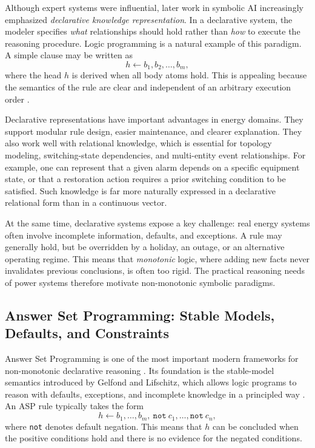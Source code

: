 Although expert systems were influential, later work in symbolic AI increasingly emphasized \emph{declarative knowledge representation}. In a declarative system, the modeler specifies \emph{what} relationships should hold rather than \emph{how} to execute the reasoning procedure. Logic programming is a natural example of this paradigm. A simple clause may be written as
\begin{equation}
	h \leftarrow b_1,b_2,\dots,b_m,
	\label{eq:ch32_logic_programming}
\end{equation}
where the head $h$ is derived when all body atoms hold. This is appealing because the semantics of the rule are clear and independent of an arbitrary execution order \cite{baral2003knowledge}.

Declarative representations have important advantages in energy domains. They support modular rule design, easier maintenance, and clearer explanation. They also work well with relational knowledge, which is essential for topology modeling, switching-state dependencies, and multi-entity event relationships. For example, one can represent that a given alarm depends on a specific equipment state, or that a restoration action requires a prior switching condition to be satisfied. Such knowledge is far more naturally expressed in a declarative relational form than in a continuous vector.

At the same time, declarative systems expose a key challenge: real energy systems often involve incomplete information, defaults, and exceptions. A rule may generally hold, but be overridden by a holiday, an outage, or an alternative operating regime. This means that \emph{monotonic} logic, where adding new facts never invalidates previous conclusions, is often too rigid. The practical reasoning needs of power systems therefore motivate non-monotonic symbolic paradigms.

\subsection{Answer Set Programming: Stable Models, Defaults, and Constraints}

Answer Set Programming is one of the most important modern frameworks for non-monotonic declarative reasoning \cite{gelfond1988stable,brewka2011asp,gebser2012answer,gebser2019multi}. Its foundation is the stable-model semantics introduced by Gelfond and Lifschitz, which allows logic programs to reason with defaults, exceptions, and incomplete knowledge in a principled way \cite{gelfond1988stable}. An ASP rule typically takes the form
\begin{equation}
	h \leftarrow b_1,\dots,b_m,\ \texttt{not}\ c_1,\dots,\texttt{not}\ c_n,
	\label{eq:ch32_asp_rule}
\end{equation}
where \texttt{not} denotes default negation. This means that $h$ can be concluded when the positive conditions hold and there is no evidence for the negated conditions.

